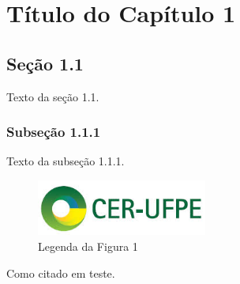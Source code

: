 \chapter{Título do Capítulo 1}

\section{Seção 1.1}
Texto da seção 1.1.

\subsection{Subseção 1.1.1}
Texto da subseção 1.1.1.

\begin{figure}[h]
    \centering
    \includegraphics[width=0.5\textwidth]{images/cer.jpeg}
    \caption{Legenda da Figura 1}
    \label{fig:figura1}
\end{figure}

Como citado em teste. \cite{referenciaExemplo}

